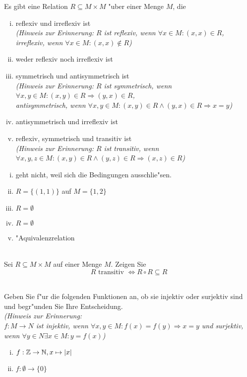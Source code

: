 Es gibt eine Relation $R\subseteq M\times M$ "uber einer Menge $M$, die 
\begin{enumerate}[(i)]
\item reflexiv und irreflexiv ist\\
\textit{(Hinweis zur Erinnerung: $R$ ist reflexiv, wenn $\forall x\in M:(x,x)\in R$, irreflexiv, wenn $\forall x\in M:(x,x)\notin R$)}
\item weder reflexiv noch irreflexiv ist
\item symmetrisch und antisymmetrisch ist\\
\textit{(Hinweis zur Erinnerung: $R$ ist symmetrisch, wenn $\forall x,y\in M:(x,y)\in R\Rightarrow (y,x)\in R$, \\antisymmetrisch, wenn $\forall x,y\in M:(x,y)\in R\wedge (y,x)\in R\Rightarrow x=y$)}
\item antisymmetrisch und irreflexiv ist
\item reflexiv, symmetrisch und transitiv ist\\
\textit{(Hinweis zur Erinnerung: $R$ ist transitiv, wenn $\forall x,y,z\in M:(x,y)\in R\wedge (y,z)\in R\Rightarrow (x,z)\in R$)}
\end{enumerate}

\begin{loesung}
\begin{enumerate}[(i)]
\item geht nicht, weil sich die Bedingungen ausschlie"sen.
\item $R=\{(1,1)\}$ auf $M=\{1,2\}$
\item $R=\emptyset$
\item $R=\emptyset$
\item "Aquivalenzrelation
\end{enumerate}
\end{loesung}
\\
Sei $R\subseteq M\times M$ auf einer Menge $M$. Zeigen Sie \[R\mbox{ transitiv }\Leftrightarrow R\circ R\subseteq R\]

\\
Geben Sie f"ur die folgenden Funktionen an, ob sie injektiv oder surjektiv sind und begr"unden Sie Ihre Entscheidung.\\
\textit{(Hinweis zur Erinnerung:\\$f:M\to N$ ist injektiv, wenn $\forall x,y\in M:f(x)=f(y)\Rightarrow x=y$ und surjektiv, wenn $\forall y\in N\exists x\in M:y=f(x)$)}

\begin{enumerate}[(i)]
\item $f:\mathbb{Z}\to\mathbb{N}, x\mapsto |x|$
\item $f:\emptyset\to\{0\}$
\end{enumerate}

